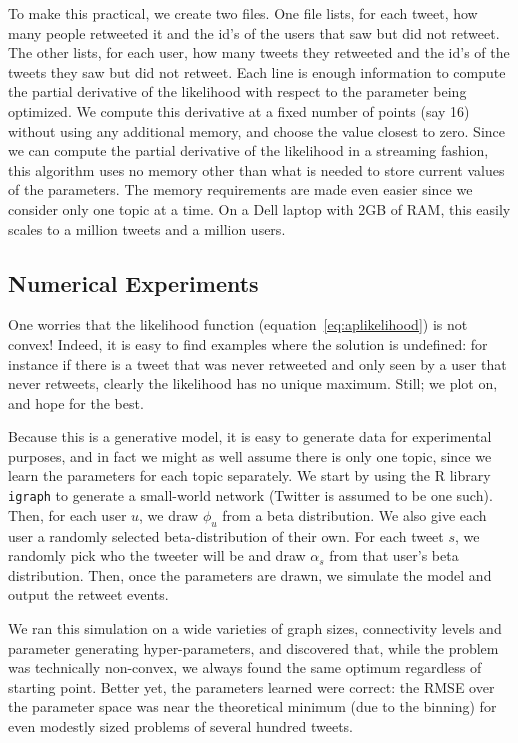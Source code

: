 To make this practical, we create two files.  
One file lists, for each tweet, how many people retweeted it and the id's of the users that saw but did not retweet.
The other lists, for each user, how many tweets they retweeted and the id's of the tweets they saw but did not retweet.
Each line is enough information to compute the partial derivative of the likelihood with respect to the parameter being optimized.
We compute this derivative at a fixed number of points (say 16) without using any additional memory, and choose the value closest to zero.
Since we can compute the partial derivative of the likelihood in a streaming fashion, this algorithm uses no memory other than what is needed to store current values of the parameters.
The memory requirements are made even easier since we consider only one topic at a time.  
On a Dell laptop with 2GB of RAM, this easily scales to a million tweets and a million users.  

\subsection{Numerical Experiments}

One worries that the likelihood function  (equation~\eqref{eq:aplikelihood}) is not convex!
Indeed, it is easy to find examples where the solution is undefined: for instance if there is a tweet that was never retweeted and only seen by a user that never retweets, clearly the likelihood has no unique maximum.
Still; we plot on, and hope for the best.

Because this is a generative model, it is easy to generate data for experimental purposes, and in fact we might as well assume there is only one topic, since we learn the parameters for each topic separately.  
We start by using the R library \texttt{igraph} to generate a small-world network (Twitter is assumed to be one such).
Then, for each user $u$, we draw $\phi_u$ from a beta distribution.  
We also give each user a randomly selected beta-distribution of their own.  
For each tweet $s$, we randomly pick who the tweeter will be and draw $\alpha_s$ from that user's beta distribution.  
Then, once the parameters are drawn, we simulate the model and output the retweet events.

We ran this simulation on a wide varieties of graph sizes, connectivity levels and parameter generating hyper-parameters, and discovered that, while the problem was technically non-convex, we always found the same optimum regardless of starting point.  
Better yet, the parameters learned were correct: the RMSE over the parameter space was near the theoretical minimum (due to the binning) for even modestly sized problems of several hundred tweets.  

